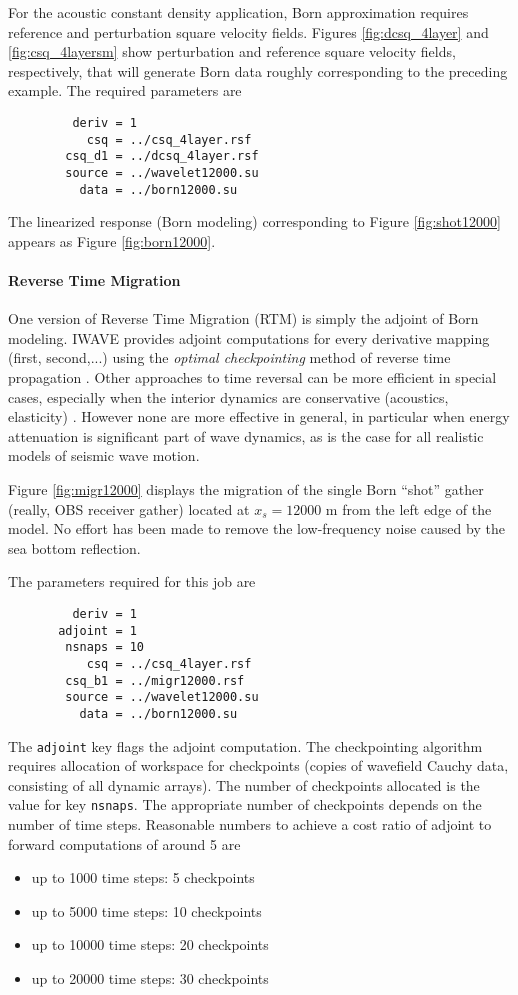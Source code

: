 For the acoustic constant density application, Born approximation
requires reference and perturbation square velocity fields. Figures
\ref{fig:dcsq_4layer} and \ref{fig:csq_4layersm} show perturbation and
reference square velocity fields, respectively, that will generate
Born data roughly corresponding to the preceding example. The required
parameters are
\begin{verbatim}
         deriv = 1
           csq = ../csq_4layer.rsf
        csq_d1 = ../dcsq_4layer.rsf
        source = ../wavelet12000.su
          data = ../born12000.su
\end{verbatim}
The linearized response (Born modeling) corresponding to Figure 
\ref{fig:shot12000} appears as Figure \ref{fig:born12000}.

\noindent \paragraph{Reverse Time Migration}
One version of Reverse Time Migration (RTM) is simply the adjoint of
Born modeling. IWAVE provides adjoint computations for every
derivative mapping (first, second,...) using the {\em optimal
  checkpointing} method of reverse time propagation
\cite[]{Griewank:book,BlanVerSy:95,Plessix:06,Symes:06a-pub}. Other approaches to time reversal can be more efficient in
special cases, especially when the interior dynamics are conservative
(acoustics, elasticity) \cite[]{Dussaud:08,Clapp:09}. However
none are more effective in general, in particular when energy
attenuation is significant part of wave dynamics, as is the case for
all realistic models of seismic wave motion. 

Figure \ref{fig:migr12000} displays the migration of the single
Born ``shot'' gather (really, OBS receiver gather) located at $x_s = 12000$ m from
the left edge of the model. No effort has been made to remove the
low-frequency noise caused by the sea bottom reflection.

The parameters required for this job are
\begin{verbatim}
         deriv = 1
       adjoint = 1
        nsnaps = 10
           csq = ../csq_4layer.rsf
        csq_b1 = ../migr12000.rsf
        source = ../wavelet12000.su
          data = ../born12000.su
\end{verbatim}

The {\tt adjoint} key flags the adjoint computation. The checkpointing
algorithm requires allocation of workspace for checkpoints (copies of
wavefield Cauchy data, consisting of all dynamic arrays).  The number
of checkpoints allocated is the value for key {\tt nsnaps}. The
appropriate number of checkpoints depends on the number of time
steps. Reasonable numbers to achieve a cost ratio of adjoint to
forward computations of around 5 are
\begin{itemize}
\item up to 1000 time steps: 5 checkpoints
\item up to 5000 time steps: 10 checkpoints
\item up to 10000 time steps: 20 checkpoints
\item up to 20000 time steps: 30 checkpoints
\end{itemize}

